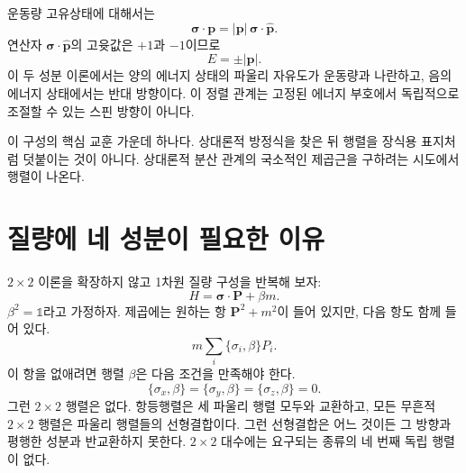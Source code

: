 운동량 고유상태에 대해서는
\begin{equation}
\boldsymbol{\sigma}\cdot\mathbf p
=
|\mathbf p|\,\boldsymbol{\sigma}\cdot\widehat{\mathbf p}.
\end{equation}
연산자 \(\boldsymbol{\sigma}\cdot\widehat{\mathbf p}\)의 고윳값은 \(+1\)과 \(-1\)이므로
\begin{equation}
E=\pm|\mathbf p|.
\end{equation}
이 두 성분 이론에서는 양의 에너지 상태의 파울리 자유도가 운동량과 나란하고, 음의 에너지 상태에서는 반대 방향이다. 이 정렬 관계는 고정된 에너지 부호에서 독립적으로 조절할 수 있는 스핀 방향이 아니다.

\begin{classroomqa}\end{classroomqa}

이 구성의 핵심 교훈 가운데 하나다. 상대론적 방정식을 찾은 뒤 행렬을 장식용 표지처럼 덧붙이는 것이 아니다. 상대론적 분산 관계의 국소적인 제곱근을 구하려는 시도에서 행렬이 나온다.

\section{질량에 네 성분이 필요한 이유}

\(2\times2\) 이론을 확장하지 않고 1차원 질량 구성을 반복해 보자:
\begin{equation}
H=\boldsymbol{\sigma}\cdot\mathbf P+\beta m.
\label{eq:l10-failed-mass}
\end{equation}
\(\beta^2=\mathbb{1}\)라고 가정하자. 제곱에는 원하는 항 \(\mathbf P^2+m^2\)이 들어 있지만, 다음 항도 함께 들어 있다.
\begin{equation}
m\sum_i\{\sigma_i,\beta\}P_i.
\end{equation}
이 항을 없애려면 행렬 \(\beta\)은 다음 조건을 만족해야 한다.
\begin{equation}
\{\sigma_x,\beta\}
=
\{\sigma_y,\beta\}
=
\{\sigma_z,\beta\}
=0.
\label{eq:l10-impossible-beta}
\end{equation}
그런 \(2\times2\) 행렬은 없다. 항등행렬은 세 파울리 행렬 모두와 교환하고, 모든 무흔적 \(2\times2\) 행렬은 파울리 행렬들의 선형결합이다. 그런 선형결합은 어느 것이든 그 방향과 평행한 성분과 반교환하지 못한다. \(2\times2\) 대수에는 요구되는 종류의 네 번째 독립 행렬이 없다.

